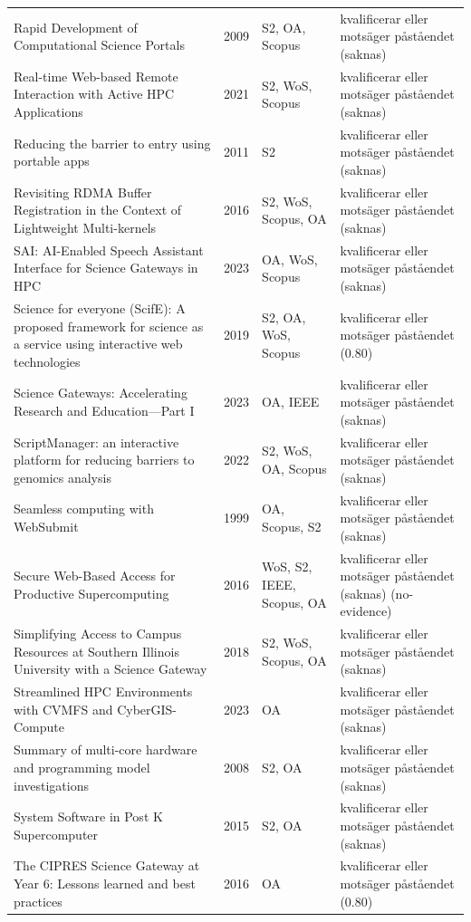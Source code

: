 \begin{longtable}{@{}%
  >{\raggedright\arraybackslash}p{}c%
  >{\raggedright\arraybackslash}p{}%
  >{\raggedright\arraybackslash}p{}@{}}
Rapid Development of Computational Science Portals & 2009 & S2, OA, Scopus & kvalificerar eller motsäger påståendet (saknas) \\
Real-time Web-based Remote Interaction with Active HPC Applications & 2021 & S2, WoS, Scopus & kvalificerar eller motsäger påståendet (saknas) \\
Reducing the barrier to entry using portable apps & 2011 & S2 & kvalificerar eller motsäger påståendet (saknas) \\
Revisiting RDMA Buffer Registration in the Context of Lightweight Multi-kernels & 2016 & S2, WoS, Scopus, OA & kvalificerar eller motsäger påståendet (saknas) \\
SAI: AI-Enabled Speech Assistant Interface for Science Gateways in HPC & 2023 & OA, WoS, Scopus & kvalificerar eller motsäger påståendet (saknas) \\
Science for everyone (ScifE): A proposed framework for science as a service using interactive web technologies & 2019 & S2, OA, WoS, Scopus & kvalificerar eller motsäger påståendet (0.80) \\
Science Gateways: Accelerating Research and Education---Part I & 2023 & OA, IEEE & kvalificerar eller motsäger påståendet (saknas) \\
ScriptManager: an interactive platform for reducing barriers to genomics analysis & 2022 & S2, WoS, OA, Scopus & kvalificerar eller motsäger påståendet (saknas) \\
Seamless computing with WebSubmit & 1999 & OA, Scopus, S2 & kvalificerar eller motsäger påståendet (saknas) \\
Secure Web-Based Access for Productive Supercomputing & 2016 & WoS, S2, IEEE, Scopus, OA & kvalificerar eller motsäger påståendet (saknas) (no-evidence) \\
Simplifying Access to Campus Resources at Southern Illinois University with a Science Gateway & 2018 & S2, WoS, Scopus, OA & kvalificerar eller motsäger påståendet (saknas) \\
Streamlined HPC Environments with CVMFS and CyberGIS-Compute & 2023 & OA & kvalificerar eller motsäger påståendet (saknas) \\
Summary of multi-core hardware and programming model investigations & 2008 & S2, OA & kvalificerar eller motsäger påståendet (saknas) \\
System Software in Post K Supercomputer & 2015 & S2, OA & kvalificerar eller motsäger påståendet (saknas) \\
The CIPRES Science Gateway at Year 6: Lessons learned and best practices & 2016 & OA & kvalificerar eller motsäger påståendet (0.80) \\

\end{longtable}
